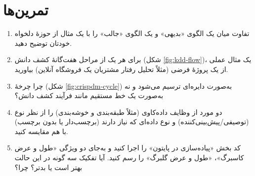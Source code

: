 \section*{تمرین‌ها}

\begin{enumerate}
    \item تفاوت میان یک الگوی «بدیهی» و یک الگوی «جالب» را با یک مثال از
          حوزهٔ دلخواه خودتان توضیح دهید.
    \item برای هر یک از مراحل هفت‌گانهٔ کشف دانش (شکل \ref{fig:kdd-flow})، یک
          مثال عملی از یک پروژهٔ فرضی (مثلاً تحلیل رفتار مشتریان یک
          فروشگاه آنلاین) بیاورید.
    \item چرا چرخهٔ  (شکل \ref{fig:crispdm-cycle}) به‌صورت
          دایره‌ای ترسیم می‌شود و نه به‌صورت یک خط مستقیم مانند فرآیند
          کشف دانش؟
    \item دو مورد از وظایف داده‌کاوی (مثلاً طبقه‌بندی و خوشه‌بندی) را از
          نظر نوع (توصیفی/پیش‌بینی‌کننده) و نوع داده‌ای که نیاز دارند
          (برچسب‌دار یا بدون برچسب) با هم مقایسه کنید.
    \item کد بخش «پیاده‌سازی در پایتون» را اجرا کنید و به‌جای دو ویژگی
          «طول و عرض کاسبرگ»، «طول و عرض گلبرگ» را رسم کنید. آیا تفکیک
          سه گونه در این حالت بهتر است یا بدتر؟ چرا؟
\end{enumerate}
